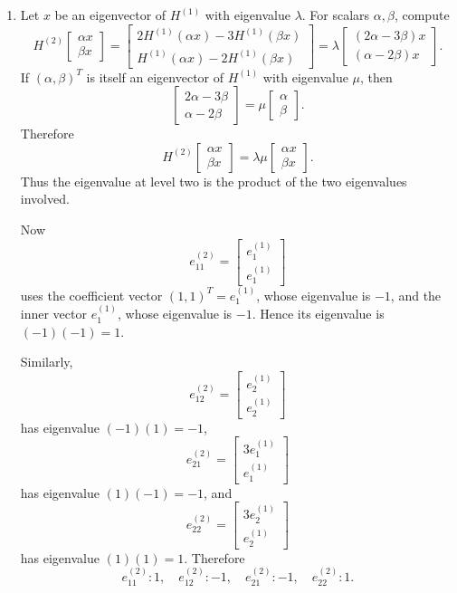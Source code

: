 \documentclass[12pt]{article}
\begin{document}
\begin{enumerate}[label=(\alph*)]
  \item Let $x$ be an eigenvector of $H^{(1)}$ with eigenvalue $\lambda$. For scalars $\alpha,\beta$, compute
  \[
  H^{(2)}\begin{bmatrix}\alpha x\\\beta x\end{bmatrix}
  =\begin{bmatrix}
  2H^{(1)}(\alpha x)-3H^{(1)}(\beta x)\\
  H^{(1)}(\alpha x)-2H^{(1)}(\beta x)
  \end{bmatrix}
  =\lambda\begin{bmatrix}(2\alpha-3\beta)x\\(\alpha-2\beta)x\end{bmatrix}.
  \]
  If $(\alpha,\beta)^T$ is itself an eigenvector of $H^{(1)}$ with eigenvalue $\mu$, then
  \[
  \begin{bmatrix}2\alpha-3\beta\\\alpha-2\beta\end{bmatrix}
  =\mu\begin{bmatrix}\alpha\\\beta\end{bmatrix}.
  \]
  Therefore
  \[
  H^{(2)}\begin{bmatrix}\alpha x\\\beta x\end{bmatrix}
  =\lambda\mu\begin{bmatrix}\alpha x\\\beta x\end{bmatrix}.
  \]
  Thus the eigenvalue at level two is the product of the two eigenvalues involved.

  Now
  \[
  e_{11}^{(2)}=\begin{bmatrix}e_1^{(1)}\\e_1^{(1)}\end{bmatrix}
  \]
  uses the coefficient vector $(1,1)^T=e_1^{(1)}$, whose eigenvalue is $-1$, and the inner vector $e_1^{(1)}$, whose eigenvalue is $-1$. Hence its eigenvalue is $(-1)(-1)=1$.

  Similarly,
  \[
  e_{12}^{(2)}=\begin{bmatrix}e_2^{(1)}\\e_2^{(1)}\end{bmatrix}
  \]
  has eigenvalue $(-1)(1)=-1$,
  \[
  e_{21}^{(2)}=\begin{bmatrix}3e_1^{(1)}\\e_1^{(1)}\end{bmatrix}
  \]
  has eigenvalue $(1)(-1)=-1$, and
  \[
  e_{22}^{(2)}=\begin{bmatrix}3e_2^{(1)}\\e_2^{(1)}\end{bmatrix}
  \]
  has eigenvalue $(1)(1)=1$.
  Therefore
  \[
  \boxed{
  e_{11}^{(2)}:1,
  \quad
  e_{12}^{(2)}:-1,
  \quad
  e_{21}^{(2)}:-1,
  \quad
  e_{22}^{(2)}:1.}
  \]


\end{enumerate}
\end{document}
